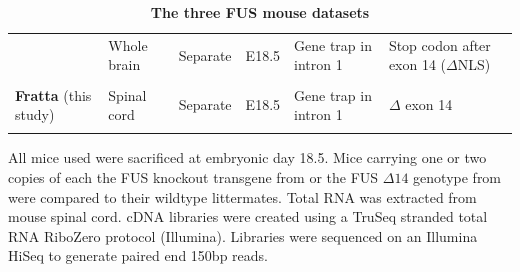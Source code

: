 \begin{longtable}[t]{@{}llllll@{}}
\begin{minipage}[t]{0.16\columnwidth}
	\end{minipage} & \begin{minipage}[t]{0.14\columnwidth}\raggedright\strut
		{Whole brain}\strut
	\end{minipage} & \begin{minipage}[t]{0.12\columnwidth}\raggedright\strut
		{Separate}\strut
	\end{minipage} & \begin{minipage}[t]{0.10\columnwidth}\raggedright\strut
		{E18.5}\strut
	\end{minipage} & \begin{minipage}[t]{0.16\columnwidth}\raggedright\strut
		{Gene trap in intron 1}\strut
	\end{minipage} & \begin{minipage}[t]{0.16\columnwidth}\raggedright\strut
		{Stop codon after exon 14 ($\Delta$NLS)}\strut
	\end{minipage}\tabularnewline \\
	\begin{minipage}[t]{0.16\columnwidth}\raggedright\strut
		{\textbf{Fratta}}
		{(this study)}\strut
	\end{minipage} & \begin{minipage}[t]{0.14\columnwidth}\raggedright\strut
		{Spinal cord}\strut
	\end{minipage} & \begin{minipage}[t]{0.12\columnwidth}\raggedright\strut
		{Separate}\strut
	\end{minipage} & \begin{minipage}[t]{0.10\columnwidth}\raggedright\strut
		{E18.5}\strut
	\end{minipage} & \begin{minipage}[t]{0.16\columnwidth}\raggedright\strut
		{Gene trap in intron 1}\strut
	\end{minipage} & \begin{minipage}[t]{0.16\columnwidth}\raggedright\strut
		{$\Delta$ exon 14 } \strut
	\end{minipage}\tabularnewline
	\caption[The three FUS mouse datasets]{\textbf{The three FUS mouse datasets}}
	\label{tab:fus_datasets}
\end{longtable}

All mice used were sacrificed at embryonic day 18.5.
Mice carrying one or two copies of each the FUS knockout transgene from \citep{Scekic-zahirovic2016} or the FUS $\Delta14$ genotype from \citep{Devoy2017} were compared to their wildtype littermates.
Total RNA was extracted from mouse spinal cord. cDNA libraries were created using a TruSeq stranded total RNA RiboZero protocol (Illumina). 
Libraries were sequenced on an Illumina HiSeq to generate paired end 150bp reads. 


